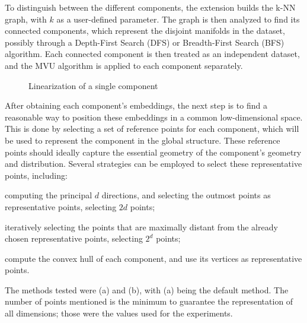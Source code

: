         To distinguish between the different components, the extension builds the k-NN graph, with $k$ as a user-defined parameter. The graph is then analyzed to find its connected components, which represent the disjoint manifolds in the dataset, possibly through a Depth-First Search (DFS) or Breadth-First Search (BFS) algorithm. Each connected component is then treated as an independent dataset, and the \ac{MVU} algorithm is applied to each component separately.


        \begin{figure}[htbp]
            \centering
            \caption{Linearization of a single component}
            \label{fig:component_linearization}
        \end{figure}

        After obtaining each component's embeddings, the next step is to find a reasonable way to position these embeddings in a common low-dimensional space. This is done by selecting a set of reference points for each component, which will be used to represent the component in the global structure. These reference points should ideally capture the essential geometry of the component's geometry and distribution. Several strategies can be employed to select these representative points, including:
        \begin{inparaenum}[(a)]
            \item computing the principal $d$ directions, and selecting the outmost points as representative points, selecting $2d$ points;
            \item iteratively selecting the points that are maximally distant from the already chosen representative points, selecting $2^d$ points;
            \item compute the convex hull of each component, and use its vertices as representative points.
        \end{inparaenum}
        The methods tested were (a) and (b), with (a) being the default method. The number of points mentioned is the minimum to guarantee the representation of all dimensions; those were the values used for the experiments.




